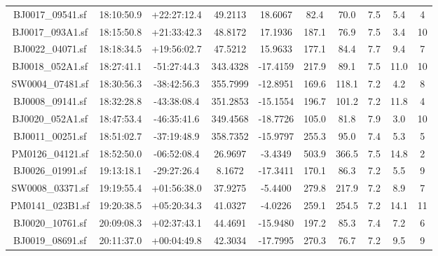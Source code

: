 \documentclass[fleqn,usenatbib]{mnras}
\begin{document}
\begin{table}
\begin{scriptsize}
\begin{center}
\begin{tabular}{@{\extracolsep{\fill}}c|c|c|c|c|c|c|c|c|c}
  BJ0017\_09541.sf    &   18:10:50.9  &   +22:27:12.4   &    49.2113    &    18.6067    &    82.4    &    70.0    &    7.5    &    5.4    &    4    \\ 
  BJ0017\_093A1.sf    &   18:15:50.8  &   +21:33:42.3   &    48.8172    &    17.1936    &    187.1    &    76.9    &    7.5    &    3.4    &    10    \\ 
  BJ0022\_04071.sf    &   18:18:34.5  &   +19:56:02.7   &    47.5212    &    15.9633    &    177.1    &    84.4    &    7.7    &    9.4    &    7    \\ 
  BJ0018\_052A1.sf    &   18:27:41.1  &   -51:27:44.3   &    343.4328    &    -17.4159    &    217.9    &    89.1    &    7.5    &    11.0    &    10    \\ 
  SW0004\_07481.sf    &   18:30:56.3  &   -38:42:56.3   &    355.7999    &    -12.8951    &    169.6    &    118.1    &    7.2    &    4.2    &    8    \\ 
  BJ0008\_09141.sf    &   18:32:28.8  &   -43:38:08.4   &    351.2853    &    -15.1554    &    196.7    &    101.2    &    7.2    &    11.8    &    4    \\ 
  BJ0020\_052A1.sf    &   18:47:53.4  &   -46:35:41.6   &    349.4568    &    -18.7726    &    105.0    &    81.8    &    7.9    &    3.0    &    10    \\ 
  BJ0011\_00251.sf    &   18:51:02.7  &   -37:19:48.9   &    358.7352    &    -15.9797    &    255.3    &    95.0    &    7.4    &    5.3    &    5    \\ 
  PM0126\_04121.sf    &   18:52:50.0  &   -06:52:08.4   &    26.9697    &    -3.4349    &    503.9    &    366.5    &    7.5    &    14.8    &    2    \\ 
  BJ0026\_01991.sf    &   19:13:18.1  &   -29:27:26.4   &    8.1672    &    -17.3411    &    170.1    &    86.3    &    7.2    &    5.5    &    9    \\ 
  SW0008\_03371.sf    &   19:19:55.4  &   +01:56:38.0   &    37.9275    &    -5.4400    &    279.8    &    217.9    &    7.2    &    8.9    &    7    \\ 
  PM0141\_023B1.sf    &   19:20:38.5  &   +05:20:34.3   &    41.0327    &    -4.0226    &    259.1    &    254.5    &    7.2    &    14.1    &    11    \\ 
  BJ0020\_10761.sf    &   20:09:08.3  &   +02:37:43.1   &    44.4691    &    -15.9480    &    197.2    &    85.3    &    7.4    &    7.2    &    6    \\ 
  BJ0019\_08691.sf    &   20:11:37.0  &   +00:04:49.8   &    42.3034    &    -17.7995    &    270.3    &    76.7    &    7.2    &    9.5    &    9    \\\hline

  \end{tabular}
  \end{center}
  \end{scriptsize}
  \end{table}
\end{document}
